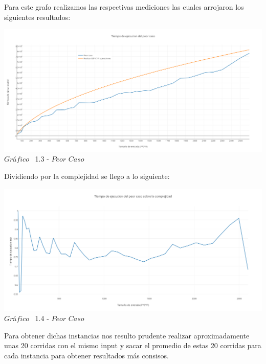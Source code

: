 Para este grafo realizamos las respectivas mediciones las cuales arrojaron los siguientes resultados:\\


\vspace*{0.3cm} \vspace*{0.3cm}
  \begin{center}
\includegraphics[scale=0.4]{./EJ1/peorcaso.png}
{$Gr$\'a$fico$ \ 1.3 - $Peor$ $Caso$}
  \end{center}
  \vspace*{0.3cm}

Dividiendo por la complejidad se llego a lo siguiente:\\

\vspace*{0.3cm} \vspace*{0.3cm}
  \begin{center}
\includegraphics[scale=0.5]{./EJ1/peorcaso1.png}
{$Gr$\'a$fico$ \ 1.4 - $Peor$ $Caso$}
  \end{center}
  \vspace*{0.3cm}

 Para obtener dichas instancias nos resulto prudente realizar aproximadamente unas 20 corridas con el mismo input y sacar el promedio de estas 20 corridas para cada instancia para obtener resultados m\'as consisos.\\ 

